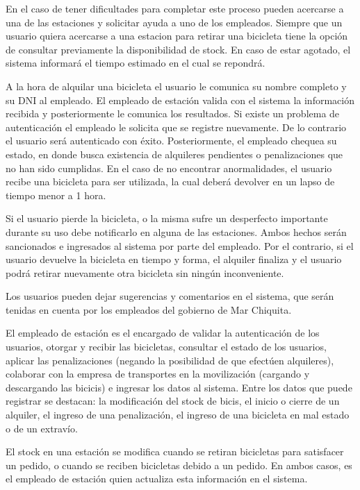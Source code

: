 En el caso de tener dificultades para completar este proceso pueden acercarse a una de las estaciones y solicitar ayuda a uno de los empleados.
Siempre que un usuario quiera acercarse a una estacion para retirar una bicicleta tiene la opción de consultar previamente la disponibilidad de stock. En caso de estar agotado, el sistema informará el tiempo
estimado en el cual se repondrá.

A la hora de alquilar una bicicleta el usuario le comunica su nombre completo y su DNI al empleado. El empleado de estación valida con el sistema la información recibida y posteriormente le comunica
los resultados. Si existe un problema de autenticación el empleado le solicita que se registre nuevamente. De lo contrario el usuario será autenticado con éxito. Posteriormente, el empleado chequea 
su estado, en donde busca existencia de alquileres pendientes o penalizaciones que no han sido cumplidas. En el caso de no encontrar anormalidades, el usuario
recibe una bicicleta para ser utilizada, la cual deberá devolver en un lapso de tiempo menor a 1 hora.

Si el usuario pierde la bicicleta, o la misma sufre un desperfecto importante durante su uso debe notificarlo en alguna de las estaciones. Ambos hechos serán sancionados e ingresados al sistema
por parte del empleado. Por el contrario, si el usuario devuelve la bicicleta en tiempo y forma, el alquiler finaliza y el usuario podrá retirar nuevamente otra bicicleta sin ningún inconveniente.

Los usuarios pueden dejar sugerencias y comentarios en el sistema, que serán tenidas en cuenta por los empleados del gobierno de Mar Chiquita.

El empleado de estación es el encargado de validar la autenticación de los usuarios, otorgar y recibir las bicicletas, consultar el estado de los usuarios, aplicar las penalizaciones (negando la posibilidad
de que efectúen alquileres), colaborar con la empresa de transportes en la movilización (cargando y descargando las
bicicis) e ingresar los datos al sistema. Entre los datos que puede registrar se destacan: la modificación del stock de bicis, el inicio o cierre de un alquiler, 
el ingreso de una penalización, el ingreso de una bicicleta en mal estado o de un extravío.

El stock en una estación se modifica cuando se retiran bicicletas para satisfacer un pedido, o cuando se reciben bicicletas debido a un pedido. En ambos casos, es el empleado de estación quien actualiza esta información en el sistema.

